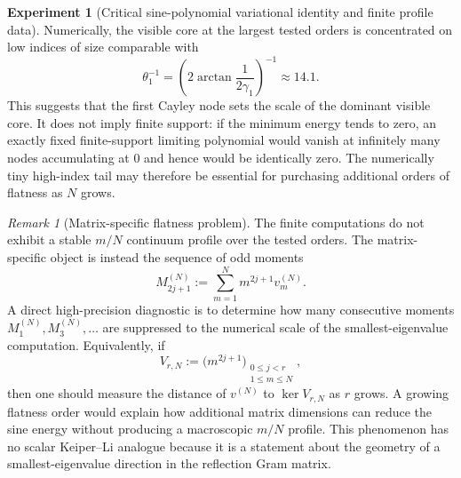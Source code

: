 \documentclass[11pt]{amsart}
\numberwithin{equation}{section}
\theoremstyle{plain}
\theoremstyle{definition}
\newtheorem{experiment}[theorem]{Experiment}
\theoremstyle{remark}
\newtheorem{remark}[theorem]{Remark}
\begin{document}
\begin{experiment}[Critical sine-polynomial variational identity and finite profile data]
Numerically, the visible core at the largest tested orders is concentrated on low indices of size comparable with
\begin{equation}
 \theta_1^{-1}
 =\left(2\arctan\frac{1}{2\gamma_1}\right)^{-1}
 \approx 14.1.
 \label{eq:first_zero_visible_core_scale}
\end{equation}
This suggests that the first Cayley node sets the scale of the dominant visible core.  It does not imply finite support: if the minimum energy tends to zero, an exactly fixed finite-support limiting polynomial would vanish at infinitely many nodes accumulating at $0$ and hence would be identically zero.  The numerically tiny high-index tail may therefore be essential for purchasing additional orders of flatness as $N$ grows.
\end{experiment}

\begin{remark}[Matrix-specific flatness problem]
\label{rem:critical_vector_continuum}
The finite computations do not exhibit a stable $m/N$ continuum profile over the tested orders.
The matrix-specific object is instead the sequence of odd moments
\begin{equation}
 M_{2j+1}^{(N)}:=\sum_{m=1}^N m^{2j+1}v_m^{(N)}.
 \label{eq:critical_odd_moments}
\end{equation}
A direct high-precision diagnostic is to determine how many consecutive moments $M_1^{(N)},M_3^{(N)},\ldots$ are suppressed to the numerical scale of the smallest-eigenvalue computation.  Equivalently, if
\begin{equation}
 V_{r,N}:=\bigl(m^{2j+1}\bigr)_{\substack{0\le j<r\\1\le m\le N}},
 \label{eq:odd_moment_matrix}
\end{equation}
then one should measure the distance of $v^{(N)}$ to $\ker V_{r,N}$ as $r$ grows.  A growing flatness order would explain how additional matrix dimensions can reduce the sine energy without producing a macroscopic $m/N$ profile.  This phenomenon has no scalar Keiper--Li analogue because it is a statement about the geometry of a smallest-eigenvalue direction in the reflection Gram matrix.
\end{remark}
\end{document}
